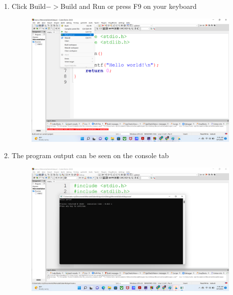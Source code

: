 \begin{enumerate}
\begin{figure}[H]
		      \caption{}
		      \label{fig:screenshot008}
	      \end{figure}
	\item Click Build$->$Build and Run or press F9 on your keyboard
	      \begin{figure}[H]
		      \centering
		      \includegraphics[width=0.7\linewidth]{P1/img/screenshot009.png}
		      \caption{}
		      \label{fig:screenshot009}
	      \end{figure}
	\item The program output can be seen on the console tab
	      \begin{figure}[H]
		      \centering
		      \includegraphics[width=0.7\linewidth]{P1/img/screenshot010.png}
		      \caption{}
		      \label{fig:screenshot010}
	      \end{figure}
\end{enumerate}

